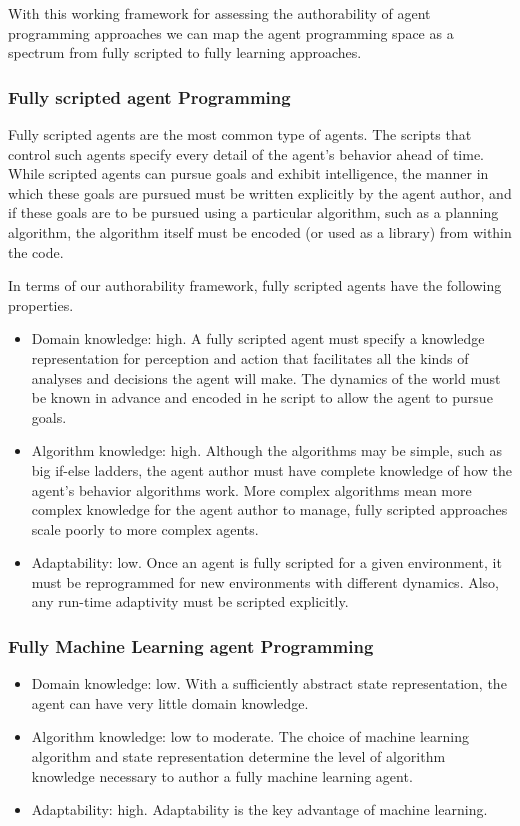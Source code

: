 With this working framework for assessing the authorability of agent programming approaches we can map the agent programming space as a spectrum from fully scripted to fully learning approaches.

\subsubsection{Fully scripted agent Programming}

Fully scripted agents are the most common type of agents.  The scripts that control such agents specify every detail of the agent's behavior ahead of time.  While scripted agents can pursue goals and exhibit intelligence, the manner in which these goals are pursued must be written explicitly by the agent author, and if these goals are to be pursued using a particular algorithm, such as a planning algorithm, the algorithm itself must be encoded (or used as a library) from within the code.

In terms of our authorability framework, fully scripted agents have the following properties.

\begin{itemize}
\item Domain knowledge: high. A fully scripted agent must specify a knowledge representation for perception and action that facilitates all the kinds of analyses and decisions the agent will make.  The dynamics of the world must be known in advance and encoded in he script to allow the agent to pursue goals.
\item Algorithm knowledge: high.  Although the algorithms may be simple, such as big if-else ladders, the agent author must have complete knowledge of how the agent's behavior algorithms work.  More complex algorithms mean more complex knowledge for the agent author to manage, fully scripted approaches scale poorly to more complex agents.
\item Adaptability: low.  Once an agent is fully scripted for a given environment, it must be reprogrammed for new environments with different dynamics.  Also, any run-time adaptivity must be scripted explicitly.
\end{itemize}

\subsubsection{Fully Machine Learning agent Programming}

\begin{itemize}
\item Domain knowledge: low. With a sufficiently abstract state representation, the agent can have very little domain knowledge.
\item Algorithm knowledge: low to moderate.  The choice of machine learning algorithm and state representation determine the level of algorithm knowledge necessary to author a fully machine learning agent.
\item Adaptability: high.  Adaptability is the key advantage of machine learning.
\end{itemize}

